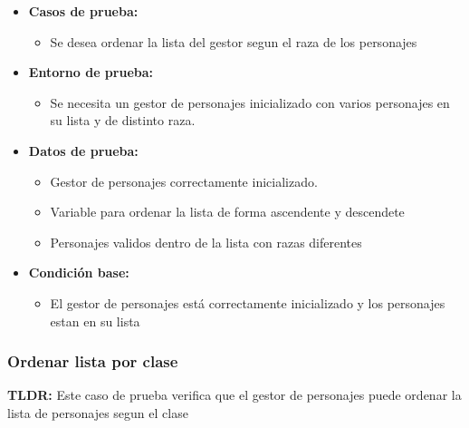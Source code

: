\documentclass{article}
\begin{document}
\begin{itemize}
	\item \textbf{Casos de prueba:}
	\begin{itemize}
		\item Se desea ordenar la lista del gestor segun el raza de los personajes
	\end{itemize}
	
	\item \textbf{Entorno de prueba:}
	\begin{itemize}
		\item Se necesita un gestor de personajes inicializado con varios personajes en su lista y de distinto raza.
	\end{itemize}
	
	\item \textbf{Datos de prueba:}
	\begin{itemize}
		\item Gestor de personajes correctamente inicializado.
        \item Variable para ordenar la lista de forma ascendente y descendete
		\item Personajes validos dentro de la lista con razas diferentes
	\end{itemize}
	
	\item \textbf{Condición base:}
	\begin{itemize}
		\item El gestor de personajes está correctamente inicializado y los personajes estan en su lista
	\end{itemize}
	
\end{itemize}

\subsubsection{Ordenar lista por clase}
\textbf{TLDR:} Este caso de prueba verifica que el gestor de personajes puede ordenar la lista de personajes segun el clase 
\end{document}
